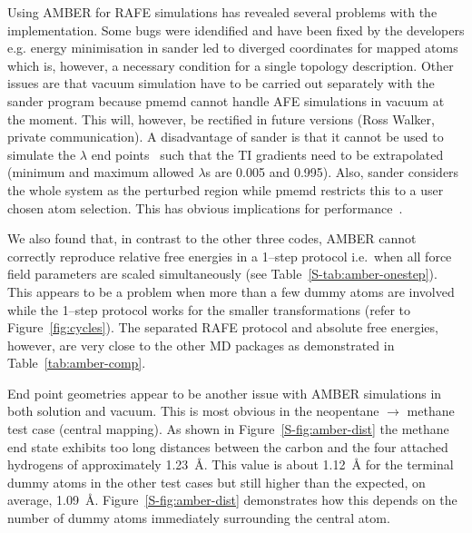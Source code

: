 \documentclass[journal=jctcce,manuscript=article]{achemso}
\begin{document}
Using AMBER for RAFE simulations has revealed several problems with
the implementation.  Some bugs were idendified and have been fixed
by the developers e.g. energy minimisation in sander led to diverged
coordinates for mapped atoms which is, however, a necessary condition
for a single topology description.  Other issues are that vacuum
simulation have to be carried out separately with the sander program
because pmemd cannot handle AFE simulations in vacuum at the moment.  This will, however, be rectified in future versions (Ross Walker, private communication).  A disadvantage of sander is that it cannot be used to simulate the $\lambda$ end points~\cite{doi:10.1021/ct400340s} such that the TI gradients need to be extrapolated (minimum and maximum allowed $\lambda$s are 0.005 and 0.995).  Also, sander considers the whole system as the perturbed
region while pmemd restricts this to a user chosen atom selection.  This
has obvious implications for performance~\cite{doi:10.1021/ct400340s}.

We also found that, in contrast to the other three codes, AMBER cannot
correctly reproduce relative free energies in a 1--step protocol i.e.\
when all force field parameters are scaled simultaneously (see Table~\ref{S-tab:amber-onestep}).  This appears to be a problem when more than a few dummy atoms are involved while the 1--step protocol works for the smaller transformations (refer to Figure~\ref{fig:cycles}).  The separated RAFE protocol and absolute free energies, however, are very close to the other MD packages as demonstrated in Table~\ref{tab:amber-comp}.

End point geometries appear to be another issue with AMBER simulations
in both solution and vacuum.  This is most obvious in the neopentane $\rightarrow$ methane test case (central mapping).  As shown in Figure~\ref{S-fig:amber-dist} the methane end state exhibits too long distances between the carbon and the four attached hydrogens of approximately \SI{1.23}{\angstrom}.  This value is about \SI{1.12}{\angstrom} for the terminal dummy atoms in the other test cases but still higher than the expected, on average, \SI{1.09}{\angstrom}.  Figure~\ref{S-fig:amber-dist} demonstrates how this depends on the number of dummy atoms immediately surrounding the central atom.
\end{document}
